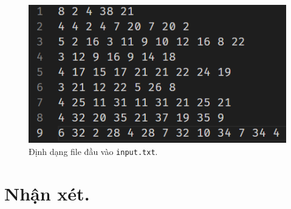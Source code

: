 \documentclass[a4paper, 11pt]{article}
\begin{document}
\begin{figure}[h]
  \centering
  \includegraphics[width=.75\textwidth,height=.75\textheight,keepaspectratio]{input.png}
  \caption{Định dạng file đầu vào \lstinline|input.txt|.}
\end{figure}

\clearpage
\section{Nhận xét.}
\end{document}
